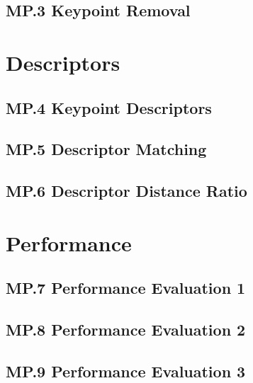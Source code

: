 \documentclass[a4paper]{scrartcl}
\begin{document}
\subsection*{MP.3 Keypoint Removal}

\section*{Descriptors}
\subsection*{MP.4 Keypoint Descriptors}
\subsection*{MP.5 Descriptor Matching}
\subsection*{MP.6 Descriptor Distance Ratio}

\section*{Performance}
\subsection*{MP.7 Performance Evaluation 1}
\subsection*{MP.8 Performance Evaluation 2}
\subsection*{MP.9 Performance Evaluation 3}
\end{document}
